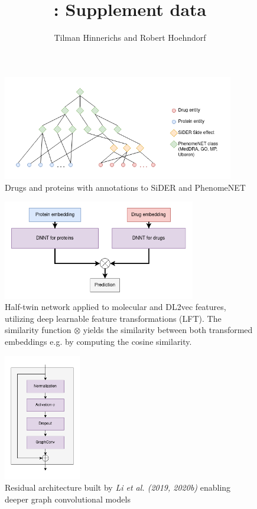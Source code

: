 \documentclass[]{article}
\title{\name{}: Supplement data}
\author{Tilman Hinnerichs and Robert Hoehndorf}
\date{}
\begin{document}
\maketitle

\begin{figure}[ht]%
 	\centerline{\includegraphics[width=0.9\textwidth]{../figures/drug_protein_ontology_network.png}}
 	\caption{Drugs and proteins with annotations to SiDER and PhenomeNET}
 	\label{fig:Onto}
\end{figure}

\begin{figure}[ht]%
 	\centerline{\includegraphics[width=0.75\textwidth]{../figures/siamese_network.png}}
 	\caption{Half-twin network applied to molecular and DL2vec
        features, utilizing deep learnable feature transformations
        (LFT). The similarity function $\otimes$ yields the
        similarity between both transformed embeddings e.g. by
        computing the cosine similarity.}
 	\label{fig:HalfTwinNetwork}
\end{figure}

\begin{figure}[ht]%
 	\centerline{\includegraphics[width=0.3\textwidth]{../figures/ResGraphConvBlocks.png}}
 	\caption{Residual architecture built by \textit{Li et al. (2019, 2020b)} enabling deeper graph convolutional models}
 	\label{fig:ResGraphConvBlocks}
\end{figure}
\end{document}
